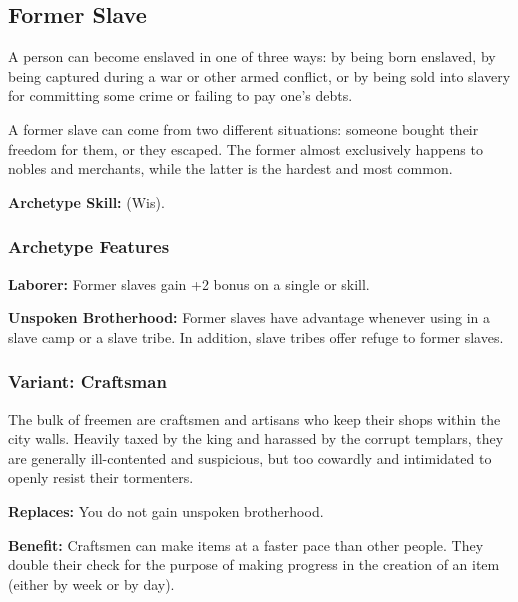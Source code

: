 \subsection{Former Slave}
A person can become enslaved in one of three ways: by being born enslaved, by being captured during a war or other armed conflict, or by being sold into slavery for committing some crime or failing to pay one's debts.

A former slave can come from two different situations: someone bought their freedom for them, or they escaped. The former almost exclusively happens to nobles and merchants, while the latter is the hardest and most common.

\textbf{Archetype Skill:}  (Wis).

\subsubsection{Archetype Features}
\textbf{Laborer:} Former slaves gain +2 bonus on a single  or  skill.

\textbf{Unspoken Brotherhood:} Former slaves have advantage whenever using  in a slave camp or a slave tribe. In addition, slave tribes offer refuge to former slaves.

\subsubsection{Variant: Craftsman}
The bulk of freemen are craftsmen and artisans who keep their shops within the city walls. Heavily taxed by the king and harassed by the corrupt templars, they are generally ill-contented and suspicious, but too cowardly and intimidated to openly resist their tormenters.

\textbf{Replaces:} You do not gain unspoken brotherhood.

\textbf{Benefit:} Craftsmen can make items at a faster pace than other people. They double their  check for the purpose of making progress in the creation of an item (either by week or by day).
